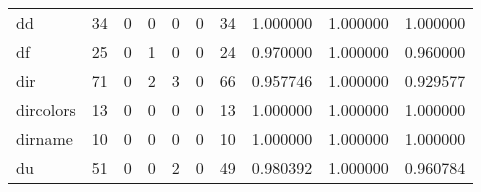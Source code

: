\begin{longtable}{lrrrrrrrrr}
dd        &                                      34 &                                                  0 &                                                  0 &                                                  0 &                                                  0 &                                                 34 &                                           1.000000 &                               1.000000 &                             1.000000 \\
df        &                                      25 &                                                  0 &                                                  1 &                                                  0 &                                                  0 &                                                 24 &                                           0.970000 &                               1.000000 &                             0.960000 \\
dir       &                                      71 &                                                  0 &                                                  2 &                                                  3 &                                                  0 &                                                 66 &                                           0.957746 &                               1.000000 &                             0.929577 \\
dircolors &                                      13 &                                                  0 &                                                  0 &                                                  0 &                                                  0 &                                                 13 &                                           1.000000 &                               1.000000 &                             1.000000 \\
dirname   &                                      10 &                                                  0 &                                                  0 &                                                  0 &                                                  0 &                                                 10 &                                           1.000000 &                               1.000000 &                             1.000000 \\
du        &                                      51 &                                                  0 &                                                  0 &                                                  2 &                                                  0 &                                                 49 &                                           0.980392 &                               1.000000 &                             0.960784 \\

\end{longtable}
